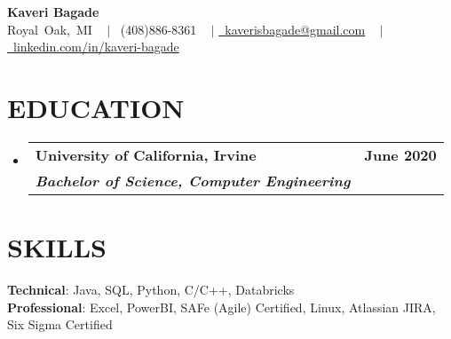 \documentclass[letterpaper,11pt]{article}
\makeatletter
\newcommand{\resumeSubheading}[4]{
  \vspace{-2pt}\item
    \begin{tabular*}{1.0\textwidth}[t]{l@{\extracolsep{\fill}}r}
      \textbf{#1} & \textbf{\small #2} \\
      \textbf{\textit{\small#3}} & \textbf{\textit{\small#4}} \\
    \end{tabular*}\vspace{-7pt}
}
\newcommand{\resumeSubHeadingListStart}{\begin{itemize}[leftmargin=0.0in, label={}]}
\newcommand{\resumeSubHeadingListEnd}{\end{itemize}}
\makeatother
\begin{document}

\begin{center}
    \textbf{\fontsize{18 pt}{18 pt}\selectfont Kaveri Bagade} \\ \vspace{8pt}
    \small
        \mbox{{\color{black}\footnotesize\faMapMarker*}\hspace*{0.13cm}Royal Oak, MI} ~ $|$
        \raisebox{-0.1\height}\faPhone\ (408)886-8361 ~ $|$
        \href{mailto:kaverisbagade@gmail.com} {\raisebox{-0.2\height}\faEnvelope\  {kaverisbagade@gmail.com}} ~ $|$
        \href{http://www.linkedin.com/in/kaveri-bagade}{\raisebox{-0.2\height}\faLinkedin\ {linkedin.com/in/kaveri-bagade}} ~
    \vspace{-8pt}
\end{center}


\section{EDUCATION}
  \resumeSubHeadingListStart
    \resumeSubheading
      {University of California, Irvine}{June 2020}
      {Bachelor of Science, Computer Engineering}{}
  \resumeSubHeadingListEnd

\section{SKILLS}
 \begin{itemize}[leftmargin=0.0in, label={}]
    \small{\item{
     \textbf{Technical}{: Java, SQL, Python, C/C++, Databricks} \\
     \textbf{Professional}{: Excel, PowerBI, SAFe (Agile) Certified, Linux, Atlassian JIRA, Six Sigma Certified} \\
    }}
 \end{itemize}
 \vspace{-16pt}




\end{document}
